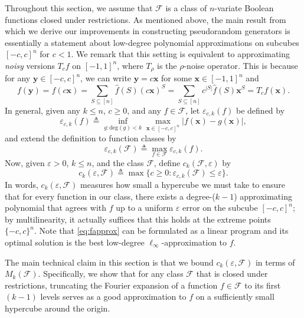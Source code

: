 \documentclass[10pt,a4paper]{article}
\newcommand{\eps}{\varepsilon}
\theoremstyle{definition}
\begin{document}
Throughout this section, we assume that $\mathcal{F}$ is a class of $n$-variate Boolean functions closed under restrictions.  As mentioned above, the main result from which we derive our improvements in constructing pseudorandom generators is essentially a statement about low-degree polynomial approximations on subcubes $[-c,c]^n$ for $c<1$.   We remark that this setting is equivalent to approximating \emph{noisy} versions $T_cf$ on $[-1,1]^n$, where $T_{\rho}$ is the $\rho$-noise operator.  This is because for any $\mathbf{y} \in [-c,c]^n$, we can write $\mathbf{y} = c\mathbf{x}$ for some $\mathbf{x} \in [-1,1]^n$ and
\[
f(\mathbf{y})
=f(c\mathbf{x})
= \sum_{S \subseteq [n]} \hat{f}(S) (c\mathbf{x})^S
= \sum_{S \subseteq [n]} c^{|S|} \hat{f}(S) \mathbf{x}^S
= T_cf(\mathbf{x}) .
\]
In general, given any $k\leq n$, $c\geq 0$, and any $f\in \mathcal{F}$, let $\eps_{c,k}(f)$ be defined by
\begin{equation}
\label{eq:fapprox}
    \eps_{c,k}(f) \triangleq \inf_{g: \mathrm{deg}(g)< k}\max_{\mathbf{x}\in [-c,c]^n}  \vert f(\mathbf{x})-g(\mathbf{x})\vert,
\end{equation}
and extend the definition to function classes by
\begin{equation*}
    \eps_{c,k}(\mathcal{F}) \triangleq \max_{f\in \mathcal{F}} \eps_{c,k}(f).
\end{equation*}
Now, given $\eps>0$, $k\leq n$, and the class $\mathcal{F}$, define $c_k(\mathcal{F},\eps)$ by
\begin{equation*}
    c_k(\eps,\mathcal{F})\triangleq \max\{ c\geq 0: \eps_{c,k}(\mathcal{F})\leq \eps\}.
\end{equation*}
In words, $c_k(\eps,\mathcal{F})$ measures how small a hypercube we must take to ensure that for every function in our class, there exists a degree-($k-1$) approximating polynomial that agrees with $f$ up to a uniform $\eps$ error on the subcube $[-c,c]^n$; by multilinearity, it actually suffices that this holds at the extreme points $\{-c,c\}^n$. Note that \cref{eq:fapprox} can be formulated as a linear program and its optimal solution is the best low-degree  $\ell_{\infty}$-approximation to $f$.


The main technical claim in this section is that we bound $c_k \left( \eps , \mathcal{F} \right)$ in terms of $M_k(\mathcal{F})$.  Specifically, we show that for any class $\mathcal{F}$ that is closed under restrictions, truncating the Fourier expansion of a function $f \in \mathcal{F}$ to its first $(k-1)$ levels serves as a good approximation to $f$ on a sufficiently small hypercube around the origin.
\end{document}

